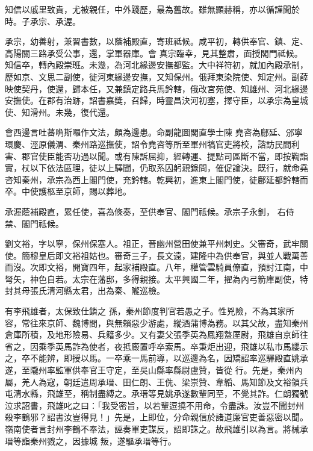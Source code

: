 \begin{pinyinscope}
 知信以戚里致貴，尤被親任，中外踐歷，最為舊故。雖無顯赫稱，亦以循謹聞於時。子承宗、承渥。



 承宗，幼善射，兼習書數，以蔭補殿直，寄班祗候。咸平初，轉供奉官、鎮、定、高陽關三路承受公事，還，掌軍器庫。會
 真宗臨幸，見其整肅，面授閣門祗候。知信卒，轉內殿崇班。未幾，為河北緣邊安撫都監。大中祥符初，就加內殿承制，歷如京、文思二副使，徙河東緣邊安撫，又知保州。俄拜東染院使、知定州。副薛映使契丹，使還，歸本任，又兼鎮定路兵馬鈐轄，俄改宮苑使、知雄州、河北緣邊安撫使。在郡有治跡，詔書嘉獎，召歸，時靈昌決河初塞，擇守臣，以承宗為皇城使、知滑州。未幾，復代還。



 會西邊言吐蕃唃斯囉作文法，頗為邊患。命副龍圖閣直學士陳
 堯咨為鄜延、邠寧環慶、涇原儀渭、秦州路巡撫使，詔令堯咨等所至軍州犒官吏將校，諮訪民間利害、郡官使臣能否功過以聞。或有陳訴屈抑，經轉運、提點司區斷不當，即按鞫詣實，杖以下依法區理，徒以上驛聞，仍取系囚躬親錄問，催促論決。既行，就命堯咨知秦州，承宗為西上閣門使，充鈐轄。乾興初，進東上閣門使，徒鄜延都鈐轄而卒。中使護柩至京師，賜以葬地。



 承渥蔭補殿直，累任使，喜為條奏，至供奉官、閣門祗候。承宗子永釗，
 右侍禁、閣門祗候。



 劉文裕，字以寧，保州保塞人。祖正，晉幽州營田使兼平州刺史。父審奇，武牢關使。簡穆皇后即文裕祖姑也。審奇三子，長文遠，建隆中為供奉官，與並人戰萬善而沒。次即文裕，開寶四年，起家補殿直。八年，權管雲騎員僚直，預討江南，中弩矢，神色自若。太宗在藩邸，多得親接。太平興國二年，擢為內弓箭庫副使，特封其母張氏清河縣太君，出為秦、隴巡檢。



 有李飛雄者，太保致仕鏻之
 孫，秦州節度判官若愚之子。性兇險，不為其家所容，常往來京師、魏博間，與無賴惡少游處，縱酒蒲博為務。以其父故，盡知秦州倉庫所積，及地形險易、兵籍多少。又有妻父張季英為鳳翔盩厔尉，飛雄自京師往省之，因乘季英馬詐為使者，夜抵廄置呼卒索馬。卒秉炬出迎，飛雄以私市馬纓示之，卒不能辨，即授以馬。一卒乘一馬前導，以巡邊為名，因矯詔率巡驛殿直姚承遂，至隴州率監軍供奉官王守定，至吳山縣率縣尉盧贊，皆從
 行。先是，秦州內屬，羌人為寇，朝廷遣周承瑨、田仁朗、王侁、梁崇贊、韋韜、馬知節及文裕領兵屯清水縣，飛雄至，稱制盡縛之。承瑨等見姚承遂數輩同至，不覺其詐。仁朗獨號泣求詔書，飛雄叱之曰：「我受密旨，以若輩逗撓不用命，令盡誅。汝豈不聞封州殺李鶴邪？詔書汝豈得見！」先是，上即位，分命親信於諸道廉官吏善惡密以聞。嶺南使者言封州李鶴不奉法，誣奏軍吏謀反，詔即誅之。故飛雄引以為言。將械承瑨等詣秦州戮之，因據城
 叛，遂驅承瑨等行。




\end{pinyinscope}
